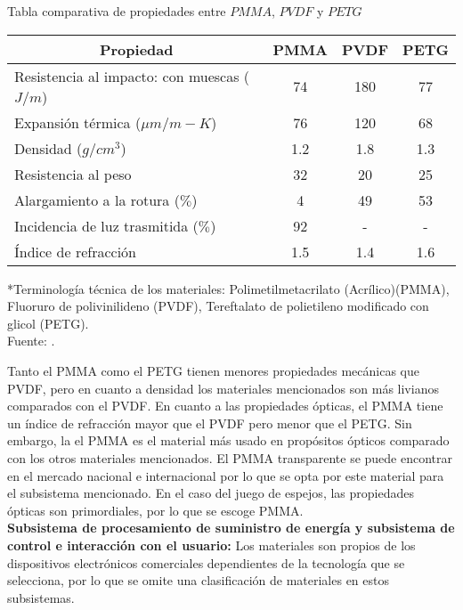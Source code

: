 \begin{mytable}[H]
	\footnotesize\centering
	\caption{Tabla comparativa de propiedades entre $PMMA$, $PVDF$ y $PETG$}
	\label{tab:tabla comparativa de propiedades entre pmma vs pvdf vs petg}
	\begin{tabular}{|l|c|c|c|}
		\hline
		\multicolumn{1}{|c|}{\textbf{Propiedad}} & \multicolumn{1}{c|}{\textbf{PMMA}} & \textbf{PVDF}& \textbf{PETG} \\ \hline
		Resistencia al impacto: con muescas ($J/m$) & 74 & 180 & 77  \\ \hline
		Expansión térmica (${\mu}m/m-K$)  & 76 & 120 & 68 \\ \hline
		Densidad ($g/cm^3$) & 1.2 & 1.8  & 1.3 \\ \hline
		Resistencia al peso  & 32 & 20 & 25 \\ \hline
		Alargamiento a la rotura ($ \% $) & 4 & 49 & 53 \\ \hline
		Incidencia de luz trasmitida ($ \% $) & 92 & - & - \\ \hline
		Índice de refracción & 1.5 & 1.4 & 1.6\\ \hline			
	\end{tabular}
	\begin{myflushcenteraftertable}
		*Terminología técnica de los materiales: Polimetilmetacrilato (Acrílico)(PMMA), Fluoruro de polivinilideno (PVDF), Tereftalato de polietileno modificado con glicol (PETG).\\		
		Fuente: \cite{Brydson1999,Berins1991,Harper2000,MakeItFrom2020}.
	\end{myflushcenteraftertable}
\end{mytable}

Tanto el PMMA como el PETG tienen menores propiedades mecánicas que PVDF, pero en cuanto a densidad los materiales mencionados son más livianos comparados con el PVDF. En cuanto a las propiedades ópticas, el PMMA tiene un índice de refracción mayor que el PVDF pero menor que el PETG. Sin embargo, la el PMMA es el material más usado en propósitos ópticos comparado con los otros materiales mencionados. El PMMA transparente se puede encontrar en el mercado nacional e internacional por lo que se opta por este material para el subsistema mencionado. En el caso del juego de espejos, las propiedades ópticas son primordiales, por lo que se escoge PMMA.\\

\textbf{Subsistema de procesamiento de suministro de energía y subsistema de control e interacción con el usuario:} Los materiales son propios de los dispositivos electrónicos comerciales dependientes de la tecnología que se selecciona, por lo que se omite una clasificación de materiales en estos subsistemas.\\

